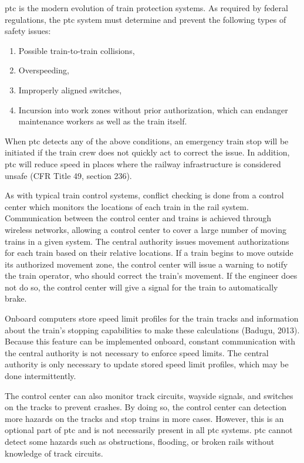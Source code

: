 \documentclass[11pt, titlepage]{article}
\begin{document}
\gls{ptc} is the modern evolution of train protection systems. As required by
federal regulations, the \gls{ptc} system must determine and prevent the following
types of safety issues:
\begin{enumerate}
    \item Possible train-to-train collisions,
    \item Overspeeding,
    \item Improperly aligned switches,
    \item Incursion into work zones without prior authorization, which can endanger
    maintenance workers as well as the train itself.
\end{enumerate}
When \gls{ptc} detects any of the above conditions, an emergency train stop will be
initiated if the train crew does not quickly act to correct the issue. In addition,
\gls{ptc} will reduce speed in places where the railway infrastructure is
considered unsafe (CFR Title 49, section 236).

As with typical train control systems, conflict checking is done from a control
center which monitors the locations of each train in the rail system. Communication
between the control center and trains is achieved through wireless networks,
allowing a control center to cover a large number of moving trains in a given
system. The central authority issues movement authorizations for each train based
on their relative locations. If a train begins to move outside its authorized
movement zone, the control center will issue a warning to notify the train
operator, who should correct the train’s movement. If the engineer does not do so,
the control center will give a signal for the train to automatically brake.

Onboard computers store speed limit profiles for the train tracks and information
about the train’s stopping capabilities to make these calculations (Badugu, 2013).
Because this feature can be implemented onboard, constant communication with the
central authority is not necessary to enforce speed limits. The central authority
is only necessary to update stored speed limit profiles, which may be done
intermittently.

The control center can also monitor track circuits, wayside signals, and switches
on the tracks to prevent crashes. By doing so, the control center can detection
more hazards on the tracks and stop trains in more cases. However, this is an
optional part of \gls{ptc} and is not necessarily present in all \gls{ptc} systems.
\gls{ptc} cannot detect some hazards such as obstructions, flooding, or broken
rails without knowledge of track circuits.
\end{document}
